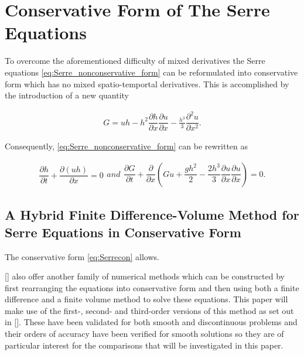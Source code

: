 \documentclass[SingleSpace,12pt,Proceedings]{Serre_ASCE}
\begin{document}
\section{Conservative Form of The Serre Equations}
To overcome the aforementioned difficulty of mixed derivatives the Serre equations \eqref{eq:Serre_nonconservative_form} can be reformulated into conservative form which has no mixed spatio-temportal derivatives. This is accomplished by the introduction of a new quantity \cite{Hank-etal-2010-2034,Zoppou-2014}
\begin{linenomath*}
\begin{gather}
\label{eq:Gdefinition}
G = uh - h^2 \dfrac{\partial h}{\partial x} \dfrac{\partial u}{\partial x} - \frac{h^3}{3} \dfrac{\partial^2 u}{\partial x^2}.
\end{gather}
\end{linenomath*}
Consequently, \eqref{eq:Serre_nonconservative_form} can be rewritten as
\begin{linenomath*}
\begin{subequations}
\begin{gather}
\dfrac{\partial h}{\partial t} + \dfrac{\partial (uh)}{\partial x} = 0
\label{eq:Serrecon_continuity}
\end{gather}
and
\begin{gather}
\dfrac{\partial G}{\partial t} + \dfrac{\partial}{\partial x}\left(Gu + \dfrac{gh^2}{2} - \dfrac{2h^3}{3}\dfrac{\partial u}{\partial x}\dfrac{\partial u}{\partial x}\right) = 0.
\label{eq:Serrecon_momentum}
\end{gather}
\label{eq:Serrecon}
\end{subequations}
\end{linenomath*}

\subsection{A Hybrid Finite Difference-Volume Method for Serre Equations in Conservative Form}
\label{section:hybridmethod}
The conservative form \eqref{eq:Serrecon} allows.

[] also offer another family of numerical methods which can be constructed by first rearranging the equations into conservative form and then using both a finite difference and a finite volume method to solve these equations. This paper will make use of the first-, second- and third-order versions of this method as set out in []. These have been validated for both smooth and discontinuous problems and their orders of accuracy have been verified for smooth solutions so they are of particular interest for the comparisons that will be investigated in this paper. 
\end{document}
